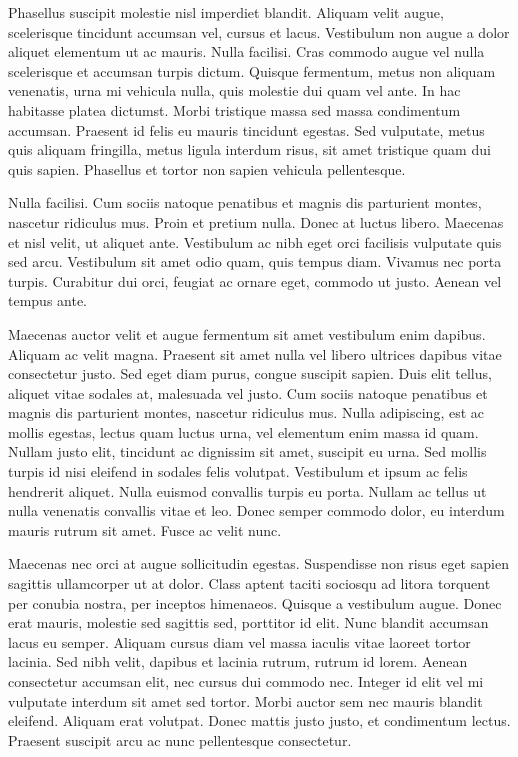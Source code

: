 Phasellus suscipit molestie nisl imperdiet blandit. Aliquam velit
augue, scelerisque tincidunt accumsan vel, cursus et lacus. Vestibulum
non augue a dolor aliquet elementum ut ac mauris. Nulla facilisi.
Cras commodo augue vel nulla scelerisque et accumsan turpis dictum.
Quisque fermentum, metus non aliquam venenatis, urna mi vehicula nulla,
quis molestie dui quam vel ante. In hac habitasse platea dictumst.
Morbi tristique massa sed massa condimentum accumsan. Praesent id
felis eu mauris tincidunt egestas. Sed vulputate, metus quis aliquam
fringilla, metus ligula interdum risus, sit amet tristique quam dui
quis sapien. Phasellus et tortor non sapien vehicula pellentesque.

Nulla facilisi. Cum sociis natoque penatibus et magnis dis parturient
montes, nascetur ridiculus mus. Proin et pretium nulla. Donec at luctus
libero. Maecenas et nisl velit, ut aliquet ante. Vestibulum ac nibh
eget orci facilisis vulputate quis sed arcu. Vestibulum sit amet odio
quam, quis tempus diam. Vivamus nec porta turpis. Curabitur dui orci,
feugiat ac ornare eget, commodo ut justo. Aenean vel tempus ante.

Maecenas auctor velit et augue fermentum sit amet vestibulum enim
dapibus. Aliquam ac velit magna. Praesent sit amet nulla vel libero
ultrices dapibus vitae consectetur justo. Sed eget diam purus, congue
suscipit sapien. Duis elit tellus, aliquet vitae sodales at, malesuada
vel justo. Cum sociis natoque penatibus et magnis dis parturient montes,
nascetur ridiculus mus. Nulla adipiscing, est ac mollis egestas, lectus
quam luctus urna, vel elementum enim massa id quam. Nullam justo elit,
tincidunt ac dignissim sit amet, suscipit eu urna. Sed mollis turpis
id nisi eleifend in sodales felis volutpat. Vestibulum et ipsum ac
felis hendrerit aliquet. Nulla euismod convallis turpis eu porta.
Nullam ac tellus ut nulla venenatis convallis vitae et leo. Donec
semper commodo dolor, eu interdum mauris rutrum sit amet. Fusce ac
velit nunc.

Maecenas nec orci at augue sollicitudin egestas. Suspendisse non risus
eget sapien sagittis ullamcorper ut at dolor. Class aptent taciti
sociosqu ad litora torquent per conubia nostra, per inceptos himenaeos.
Quisque a vestibulum augue. Donec erat mauris, molestie sed sagittis
sed, porttitor id elit. Nunc blandit accumsan lacus eu semper. Aliquam
cursus diam vel massa iaculis vitae laoreet tortor lacinia. Sed nibh
velit, dapibus et lacinia rutrum, rutrum id lorem. Aenean consectetur
accumsan elit, nec cursus dui commodo nec. Integer id elit vel mi
vulputate interdum sit amet sed tortor. Morbi auctor sem nec mauris
blandit eleifend. Aliquam erat volutpat. Donec mattis justo justo,
et condimentum lectus. Praesent suscipit arcu ac nunc pellentesque
consectetur.

